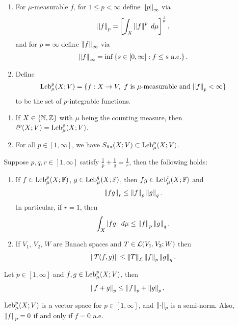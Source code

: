 \documentclass[a4paper]{article}
\begin{document}
\begin{defi}
\begin{enumerate}
\item For $\mu$-measurable $f$, for $1 \leq p < \infty$
define $\left\lVert p\right\rVert_\infty$ via 
\[
\left\lVert f\right\rVert_p = \left[ \int_X \left\lVert f\right\rVert^p \; d \mu \right]^{\frac{1}{p}},
\]
and for $p = \infty$ define $\left\lVert f\right\rVert_\infty$ via 
\[
\left\lVert f\right\rVert_\infty = \inf \left\{ s \in [0, \infty] : f 
\leq s \text{ a.e.} \right\}.
\]

\item Define 
\[
\operatorname{Leb}_\mu^p (X; V) = \{ f : X \to V, \text{ $f$ is $\mu$-measurable
and $\left\lVert f\right\rVert_p < \infty$} \}
\]
to be the set of $p$-integrable functions.
\end{enumerate}
\end{defi}

\begin{eg}
\begin{enumerate}
\item If $X \in \{\mathbb{N}, \mathbb{Z}\}$ with $\mu$ being the counting 
measure, then $\ell^p(X; V) = \operatorname{Leb}_\mu^p (X; V)$. 

\item For all $p \in [1, \infty]$, we have 
$S_{\text{fin}}(X; V) \subset \operatorname{Leb}_\mu^p (X; V)$.
\end{enumerate}
\end{eg}

\begin{thm}
Suppose $p, q, r \in [1, \infty]$ satisfy $\frac{1}{p} + \frac{1}{q}
= \frac{1}{r}$, then the following holds: 
\begin{enumerate}
\item If $f \in \operatorname{Leb}_\mu^p(X; \mathbb{F})$, $g \in \operatorname{Leb}_\mu^q (X; \mathbb{F})$,
then $f g \in \operatorname{Leb}_\mu^r (X; \mathbb{F})$ and 
\[
\left\lVert f g\right\rVert_r \leq \left\lVert f\right\rVert_p \left\lVert g\right\rVert_q.
\]
In particular, if $r = 1$, then 
\[
\int_X \left\lvert f g\right\rvert \; d \mu \leq \left\lVert f\right\rVert_p \left\lVert g\right\rVert_q.
\]

\item If $V_1$, $V_2$, $W$ are Banach spaces and 
$T \in \mathcal{L}(V_1, V_2 ; W)$ then 
\[
\left\lVert T (f, g)\right\rVert \leq \left\lVert T\right\rVert_{\mathcal{L}} \left\lVert f\right\rVert_p \left\lVert g\right\rVert_q.
\]
\end{enumerate}
\end{thm}


\begin{thm}
Let $p \in [1, \infty]$ and $f, g \in \operatorname{Leb}_\mu^p(X ; V)$, then 
\[
\left\lVert f + g\right\rVert_p \leq \left\lVert f\right\rVert_p + \left\lVert g\right\rVert_p.
\]
\end{thm}

\begin{cor}
$\operatorname{Leb}_\mu^p(X; V)$ is a vector space for $p \in [1, \infty]$, 
and $\left\lVert \cdot\right\rVert_p$ is a semi-norm. Also, 
$\left\lVert f\right\rVert_p = 0$ if and only if $f = 0$ a.e.
\end{cor}
\end{document}
